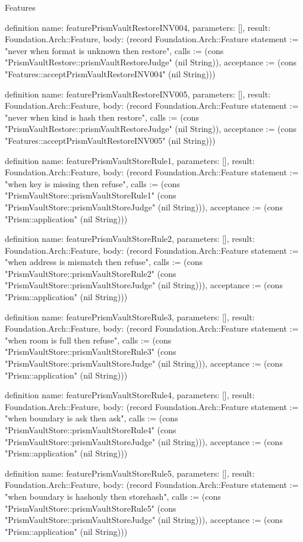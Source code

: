 \begin{lexlean}{Features}
\begin{semanticmodule}
definition{
  name: featurePrismVaultRestoreINV004,
  parameters: [],
  result: Foundation.Arch::Feature,
  body: (record Foundation.Arch::Feature {statement := "never when format is unknown then restore", calls := (cons "PrismVaultRestore::prismVaultRestoreJudge" (nil String)), acceptance := (cons "Features::acceptPrismVaultRestoreINV004" (nil String))})
}

definition{
  name: featurePrismVaultRestoreINV005,
  parameters: [],
  result: Foundation.Arch::Feature,
  body: (record Foundation.Arch::Feature {statement := "never when kind is hash then restore", calls := (cons "PrismVaultRestore::prismVaultRestoreJudge" (nil String)), acceptance := (cons "Features::acceptPrismVaultRestoreINV005" (nil String))})
}

definition{
  name: featurePrismVaultStoreRule1,
  parameters: [],
  result: Foundation.Arch::Feature,
  body: (record Foundation.Arch::Feature {statement := "when key is missing then refuse", calls := (cons "PrismVaultStore::prismVaultStoreRule1" (cons "PrismVaultStore::prismVaultStoreJudge" (nil String))), acceptance := (cons "Prism::application" (nil String))})
}

definition{
  name: featurePrismVaultStoreRule2,
  parameters: [],
  result: Foundation.Arch::Feature,
  body: (record Foundation.Arch::Feature {statement := "when address is mismatch then refuse", calls := (cons "PrismVaultStore::prismVaultStoreRule2" (cons "PrismVaultStore::prismVaultStoreJudge" (nil String))), acceptance := (cons "Prism::application" (nil String))})
}

definition{
  name: featurePrismVaultStoreRule3,
  parameters: [],
  result: Foundation.Arch::Feature,
  body: (record Foundation.Arch::Feature {statement := "when room is full then refuse", calls := (cons "PrismVaultStore::prismVaultStoreRule3" (cons "PrismVaultStore::prismVaultStoreJudge" (nil String))), acceptance := (cons "Prism::application" (nil String))})
}

definition{
  name: featurePrismVaultStoreRule4,
  parameters: [],
  result: Foundation.Arch::Feature,
  body: (record Foundation.Arch::Feature {statement := "when boundary is ask then ask", calls := (cons "PrismVaultStore::prismVaultStoreRule4" (cons "PrismVaultStore::prismVaultStoreJudge" (nil String))), acceptance := (cons "Prism::application" (nil String))})
}

definition{
  name: featurePrismVaultStoreRule5,
  parameters: [],
  result: Foundation.Arch::Feature,
  body: (record Foundation.Arch::Feature {statement := "when boundary is hashonly then storehash", calls := (cons "PrismVaultStore::prismVaultStoreRule5" (cons "PrismVaultStore::prismVaultStoreJudge" (nil String))), acceptance := (cons "Prism::application" (nil String))})
}


\end{semanticmodule}
\end{lexlean}
